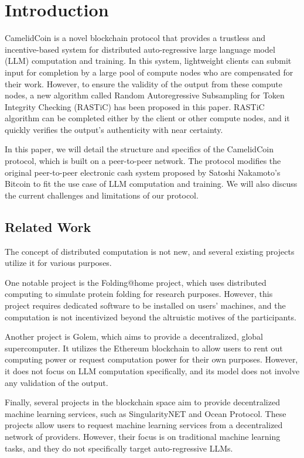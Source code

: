 \documentclass{article}
\begin{document}
\tableofcontents

\section{Introduction}
CamelidCoin is a novel blockchain protocol that provides a trustless and incentive-based system for distributed auto-regressive large language model (LLM) computation and training. 
In this system, lightweight clients can submit input for completion by a large pool of compute nodes who are compensated for their work. 
However, to ensure the validity of the output from these compute nodes, a new algorithm called Random Autoregressive Subsampling for Token Integrity Checking (RASTiC) has been proposed in this paper. 
RASTiC algorithm can be completed either by the client or other compute nodes, and it quickly verifies the output's authenticity with near certainty.

In this paper, we will detail the structure and specifics of the CamelidCoin protocol, which is built on a peer-to-peer network. The protocol modifies the original peer-to-peer electronic cash system proposed by Satoshi Nakamoto's Bitcoin to fit the use case of LLM computation and training. We will also discuss the current challenges and limitations of our protocol.
\subsection{Related Work}
The concept of distributed computation is not new, and several existing projects utilize it for various purposes.

One notable project is the Folding@home project, which uses distributed computing to simulate protein folding for research purposes.
However, this project requires dedicated software to be installed on users' machines, and the computation is not incentivized beyond the altruistic motives of the participants.

Another project is Golem, which aims to provide a decentralized, global supercomputer.
It utilizes the Ethereum blockchain to allow users to rent out computing power or request computation power for their own purposes.
However, it does not focus on LLM computation specifically, and its model does not involve any validation of the output.

Finally, several projects in the blockchain space aim to provide decentralized machine learning services, such as SingularityNET and Ocean Protocol.
These projects allow users to request machine learning services from a decentralized network of providers.
However, their focus is on traditional machine learning tasks, and they do not specifically target auto-regressive LLMs.
\end{document}
